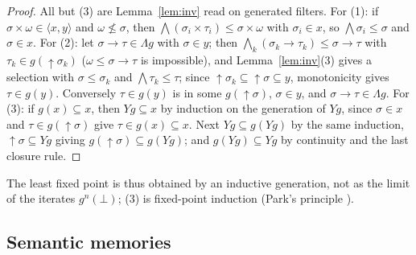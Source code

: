 \documentclass[11pt]{amsart}
\theoremstyle{definition}
\theoremstyle{remark}
\newcommand{\up}{{\uparrow}}
\begin{document}
\begin{proof}
All but (3) are Lemma~\ref{lem:inv} read on generated filters. For (1): if
$\sigma\times\omega\in\langle x,y\rangle$ and $\omega\not\le\sigma$, then
$\bigwedge(\sigma_i\times\tau_i)\le\sigma\times\omega$ with $\sigma_i\in x$,
so $\bigwedge\sigma_i\le\sigma$ and $\sigma\in x$. For (2): let
$\sigma\to\tau\in\Lambda g$ with $\sigma\in y$; then
$\bigwedge_k(\sigma_k\to\tau_k)\le\sigma\to\tau$ with
$\tau_k\in g(\up\sigma_k)$ ($\omega\le\sigma\to\tau$ is impossible), and
Lemma~\ref{lem:inv}(3) gives a selection with $\sigma\le\sigma_k$ and
$\bigwedge\tau_k\le\tau$; since $\up\sigma_k\subseteq\up\sigma\subseteq y$,
monotonicity gives $\tau\in g(y)$.
Conversely $\tau\in g(y)$ is in some $g(\up\sigma)$, $\sigma\in y$, and
$\sigma\to\tau\in\Lambda g$. For (3): if $g(x)\subseteq x$, then $Yg\subseteq x$
by induction on the generation of $Yg$, since $\sigma\in x$ and
$\tau\in g(\up\sigma)$ give $\tau\in g(x)\subseteq x$. Next
$Yg\subseteq g(Yg)$ by the same induction, $\up\sigma\subseteq Yg$ giving
$g(\up\sigma)\subseteq g(Yg)$; and $g(Yg)\subseteq Yg$ by continuity and the
last closure rule.
\end{proof}

The least fixed point is thus obtained by an inductive generation, not as
the limit of the iterates $g^n(\bot)$; (3) is fixed-point induction
(Park's principle \cite{Par69}).

\subsection{Semantic memories}
\end{document}
